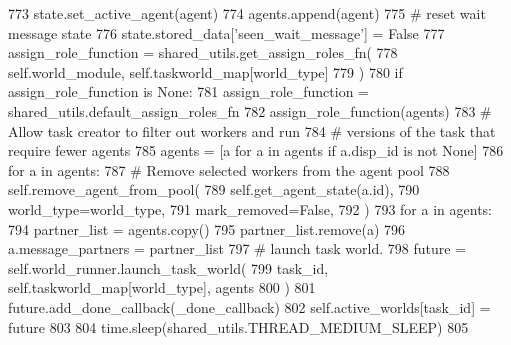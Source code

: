 \begin{DoxyCode}
773                             state.set\_active\_agent(agent)
774                             agents.append(agent)
775                             \textcolor{comment}{# reset wait message state}
776                             state.stored\_data[\textcolor{stringliteral}{'seen\_wait\_message'}] = \textcolor{keyword}{False}
777                         assign\_role\_function = shared\_utils.get\_assign\_roles\_fn(
778                             self.world\_module, self.taskworld\_map[world\_type]
779                         )
780                         \textcolor{keywordflow}{if} assign\_role\_function \textcolor{keywordflow}{is} \textcolor{keywordtype}{None}:
781                             assign\_role\_function = shared\_utils.default\_assign\_roles\_fn
782                         assign\_role\_function(agents)
783                         \textcolor{comment}{# Allow task creator to filter out workers and run}
784                         \textcolor{comment}{# versions of the task that require fewer agents}
785                         agents = [a \textcolor{keywordflow}{for} a \textcolor{keywordflow}{in} agents \textcolor{keywordflow}{if} a.disp\_id \textcolor{keywordflow}{is} \textcolor{keywordflow}{not} \textcolor{keywordtype}{None}]
786                         \textcolor{keywordflow}{for} a \textcolor{keywordflow}{in} agents:
787                             \textcolor{comment}{# Remove selected workers from the agent pool}
788                             self.remove\_agent\_from\_pool(
789                                 self.get\_agent\_state(a.id),
790                                 world\_type=world\_type,
791                                 mark\_removed=\textcolor{keyword}{False},
792                             )
793                         \textcolor{keywordflow}{for} a \textcolor{keywordflow}{in} agents:
794                             partner\_list = agents.copy()
795                             partner\_list.remove(a)
796                             a.message\_partners = partner\_list
797                         \textcolor{comment}{# launch task world.}
798                         future = self.world\_runner.launch\_task\_world(
799                             task\_id, self.taskworld\_map[world\_type], agents
800                         )
801                         future.add\_done\_callback(\_done\_callback)
802                         self.active\_worlds[task\_id] = future
803 
804             time.sleep(shared\_utils.THREAD\_MEDIUM\_SLEEP)
805 
\end{DoxyCode}
\mbox{\label{classparlai_1_1chat__service_1_1services_1_1messenger_1_1messenger__manager_1_1MessengerManager_a64b1a7241aecdca1d321efa92134ff96}} 
